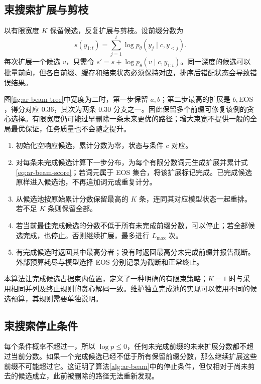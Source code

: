 \documentclass[../textbook.tex]{subfiles}
\begin{document}
\subsection{束搜索扩展与剪枝}
以有限宽度 $K$ 保留候选，反复扩展与剪枝。设前缀分数为
\begin{equation}
 s(y_{1:t})=\sum_{j=1}^{t}\log p_\theta(y_j\mid c,y_{<j}).\label{eq:ar-beam-score}
\end{equation}
每次扩展一个候选 $v$，只需令 $s' = s+\log p_\theta(v\mid c,y_{1:t})$。同一深度的候选可以批量前向，但各自前缀、缓存和结束状态必须保持对应，排序后错配状态会导致错误结果。

图\ref{fig:ar-beam-tree}中宽度为二时，第一步保留 $a,b$；第二步最高的扩展是 $b,\mathrm{EOS}$，得分对应 $0.36$，其次为两条 $0.30$ 分支之一。因此保留多个前缀可修复该例的贪心选择。有限宽度仍可能过早删除一条未来更优的路径；增大束宽不提供一般的全局最优保证，任务质量也不会随之提升。

\begin{algorithm}[以原始对数概率评分的束搜索]
\label{alg:ar-beam}
\begin{enumerate}
 \item 初始化空响应候选，累计分数为零，状态与条件 $c$ 对应。
 \item 对每条未完成候选计算下一步分布，为每个有限分数词元生成扩展并累计式\eqref{eq:ar-beam-score}；若词元属于 EOS 集合，将该扩展标记完成。已完成候选原样进入候选池，不再追加词元或重复计分。
 \item 从候选池按原始累计分数保留最高的 $K$ 条，连同其对应模型状态一起重排。若不足 $K$ 条则保留全部。
 \item 若当前最佳完成候选的分数不低于所有未完成前缀分数，可以停止；若全部候选完成，也停止。否则继续扩展，最多进行 $L_{\max}$ 次。
 \item 有完成候选时返回其中最高分者；没有时返回最高分未完成前缀并报告截断。外部预算耗尽与模型选择 EOS 分别记录为截断和正常终止。
\end{enumerate}
本算法让完成候选占据束内位置，定义了一种明确的有限束策略；$K=1$ 时与采用相同并列及终止规则的贪心解码一致。维护独立完成池的实现可以使用不同的候选预算，其规则需要单独说明。
\end{algorithm}

\subsection{束搜索停止条件}
每个条件概率不超过一，所以 $\log p\leq0$，任何未完成前缀的未来扩展分数都不超过当前分数。如果一个完成候选已经不低于所有保留前缀分数，那么继续扩展这些前缀不可能超过它。这证明了算法\ref{alg:ar-beam}中的停止条件，但仅相对于尚未剪去的候选成立，此前被删除的路径无法重新发现。
\end{document}
